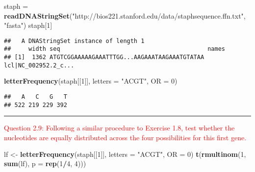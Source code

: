 \documentclass[]{article}
\newenvironment{Shaded}{\begin{snugshade}}{\end{snugshade}}
\newcommand{\KeywordTok}[1]{\textcolor[rgb]{0.13,0.29,0.53}{\textbf{#1}}}
\newcommand{\DataTypeTok}[1]{\textcolor[rgb]{0.13,0.29,0.53}{#1}}
\newcommand{\DecValTok}[1]{\textcolor[rgb]{0.00,0.00,0.81}{#1}}
\newcommand{\StringTok}[1]{\textcolor[rgb]{0.31,0.60,0.02}{#1}}
\newcommand{\OperatorTok}[1]{\textcolor[rgb]{0.81,0.36,0.00}{\textbf{#1}}}
\newcommand{\NormalTok}[1]{#1}
\begin{document}
\begin{Shaded}
\begin{Highlighting}[]
\NormalTok{staph =}\StringTok{ }\KeywordTok{readDNAStringSet}\NormalTok{(}\StringTok{"http://bios221.stanford.edu/data/staphsequence.ffn.txt"}\NormalTok{, }\StringTok{"fasta"}\NormalTok{)}
\NormalTok{staph[}\DecValTok{1}\NormalTok{]}
\end{Highlighting}
\end{Shaded}

\begin{verbatim}
##   A DNAStringSet instance of length 1
##     width seq                                          names               
## [1]  1362 ATGTCGGAAAAAGAAATTTGG...AAGAAATAAGAAATGTATAA lcl|NC_002952.2_c...
\end{verbatim}

\begin{Shaded}
\begin{Highlighting}[]
\KeywordTok{letterFrequency}\NormalTok{(staph[[}\DecValTok{1}\NormalTok{]], }\DataTypeTok{letters =} \StringTok{"ACGT"}\NormalTok{, }\DataTypeTok{OR =} \DecValTok{0}\NormalTok{)}
\end{Highlighting}
\end{Shaded}

\begin{verbatim}
##   A   C   G   T 
## 522 219 229 392
\end{verbatim}

\begin{center}\rule{0.5\linewidth}{\linethickness}\end{center}

\textcolor{red}{Question 2.9: Following a similar procedure to Exercise 1.8, test whether the nucleotides are equally distributed across the four possibilities for this first gene.}

\begin{Shaded}
\begin{Highlighting}[]
\NormalTok{lf <-}\StringTok{ }\KeywordTok{letterFrequency}\NormalTok{(staph[[}\DecValTok{1}\NormalTok{]], }\DataTypeTok{letters =} \StringTok{"ACGT"}\NormalTok{, }\DataTypeTok{OR =} \DecValTok{0}\NormalTok{)}
\KeywordTok{t}\NormalTok{(}\KeywordTok{rmultinom}\NormalTok{(}\DecValTok{1}\NormalTok{, }\KeywordTok{sum}\NormalTok{(lf), }\DataTypeTok{p =} \KeywordTok{rep}\NormalTok{(}\DecValTok{1}\OperatorTok{/}\DecValTok{4}\NormalTok{, }\DecValTok{4}\NormalTok{)))}
\end{Highlighting}
\end{Shaded}
\end{document}
